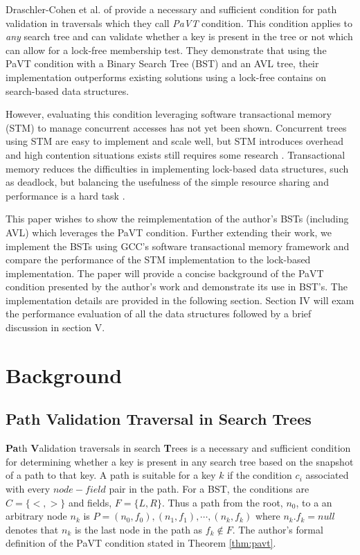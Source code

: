 \documentclass[conference]{IEEEtran}
\theoremstyle{definition}
\theoremstyle{theorem}
\begin{document}
Draschler-Cohen et al. of \cite{pavt} provide a necessary and sufficient condition for path validation in traversals which they call \textit{PaVT} condition. This condition applies to \textit{any} search tree and can validate whether a key is present in the tree or not which can allow for a lock-free membership test. They demonstrate that using the PaVT condition with a Binary Search Tree (BST) and an AVL tree, their implementation outperforms existing solutions using a lock-free contains on search-based data structures.

However, evaluating this condition leveraging software transactional memory (STM) to manage concurrent accesses has not yet been shown. Concurrent trees using STM are easy to implement and scale well, but STM introduces overhead and high contention situations exists still requires some research \cite{bron}. Transactional memory reduces the difficulties in implementing lock-based data structures, such as deadlock, but balancing the usefulness of the simple resource sharing and performance is a hard task \cite{b4}. 

This paper wishes to show the reimplementation of the author's BSTs (including AVL) which leverages the PaVT condition. Further extending their work, we implement the BSTs using GCC's software transactional memory framework and compare the performance of the STM implementation to the lock-based implementation. The paper will provide a concise background of the PaVT condition presented by the author's work and demonstrate its use in BST's. The implementation details are provided in the following section. Section IV will exam the performance evaluation of all the data structures followed by a brief discussion in section V.

\section{Background}
\subsection{Path Validation Traversal in Search Trees}
\textbf{Pa}th \textbf{V}alidation traversals in search \textbf{T}rees is a necessary and sufficient condition for determining whether a key is present in any search tree based on the snapshot of a path to that key. A path is suitable for a key $k$ if the condition $c_i$ associated with every $node-field$ pair in the path. For a BST, the conditions are $C=\{<,>\}$ and fields, $F=\{L, R\}$. Thus a path from the root, $n_0$, to a an arbitrary node $n_k$ is $P=(n_0, f_0), (n_1, f_1),\cdots, (n_k, f_k)$ where $n_k.f_k = null$ denotes that $n_k$ is the last node in the path as $f_k\not \in F$. The author's formal definition of the PaVT condition stated in Theorem \ref{thm:pavt}.
\end{document}
